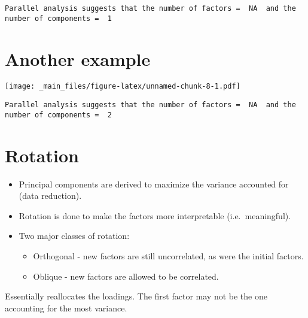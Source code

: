 \documentclass[
]{book}
\newenvironment{Shaded}{\begin{snugshade}}{\end{snugshade}}
\newcommand{\AttributeTok}[1]{\textcolor[rgb]{0.77,0.63,0.00}{#1}}
\newcommand{\FunctionTok}[1]{\textcolor[rgb]{0.00,0.00,0.00}{#1}}
\newcommand{\NormalTok}[1]{#1}
\newcommand{\SpecialCharTok}[1]{\textcolor[rgb]{0.00,0.00,0.00}{#1}}
\newcommand{\StringTok}[1]{\textcolor[rgb]{0.31,0.60,0.02}{#1}}
\providecommand{\tightlist}{%
  \setlength{\itemsep}{0pt}\setlength{\parskip}{0pt}}
\begin{document}
\begin{verbatim}
Parallel analysis suggests that the number of factors =  NA  and the number of components =  1 
\end{verbatim}

\hypertarget{another-example}{%
\section{Another example}\label{another-example}}

\begin{Shaded}
\end{Shaded}

\texttt{[image: \_main\_files/figure-latex/unnamed-chunk-8-1.pdf]}

\begin{verbatim}
Parallel analysis suggests that the number of factors =  NA  and the number of components =  2 
\end{verbatim}

\hypertarget{rotation}{%
\section{Rotation}\label{rotation}}

\begin{itemize}
\tightlist
\item
  Principal components are derived to maximize the variance accounted for (data reduction).
\item
  Rotation is done to make the factors more interpretable (i.e.~meaningful).
\item
  Two major classes of rotation:

  \begin{itemize}
  \tightlist
  \item
    Orthogonal - new factors are still uncorrelated, as were the initial factors.
  \item
    Oblique - new factors are allowed to be correlated.
  \end{itemize}
\end{itemize}

Essentially reallocates the loadings. The first factor may not be the one accounting for the most variance.
\end{document}
